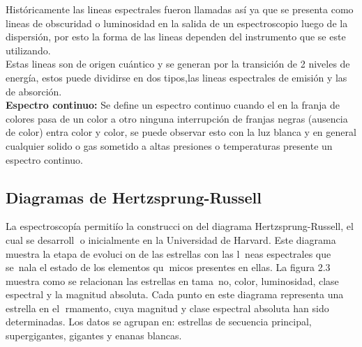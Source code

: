 \documentclass[11pt]{article}
\begin{document}
Históricamente las lineas espectrales fueron llamadas así ya que se  presenta como lineas de obscuridad o luminosidad en la salida de un espectroscopio luego de la dispersión, por esto la forma de las lineas dependen del instrumento que se este utilizando.\\
Estas lineas son de origen cuántico y se generan por la transición de 2 niveles de energía, estos puede dividirse en dos tipos,las lineas espectrales de emisión y las de absorción.\cite{troccoli}\\

\textbf{Espectro continuo:}
Se define un espectro continuo cuando el en la franja de colores  pasa de un color a otro ninguna interrupción de franjas negras (ausencia de color) entra color y color, se puede observar esto con la luz blanca y en general cualquier solido o gas sometido a altas presiones o temperaturas presente un espectro continuo.





\subsection {Diagramas de Hertzsprung-Russell}



La espectroscopía permitiío la construccion del diagrama Hertzsprung-Russell, el cual se desarroll
o inicialmente en la Universidad de Harvard.
Este diagrama muestra la etapa de evolucion
de las estrellas con las lneas espectrales que se~nala el estado de los elementos qumicos presentes
en ellas. La figura 2.3 muestra como se relacionan las estrellas en tama~no, color, luminosidad,
clase espectral y la magnitud absoluta. Cada punto en este diagrama representa una
estrella en el rmamento, cuya magnitud y clase espectral absoluta han sido determinadas.
Los datos se agrupan en: estrellas de secuencia principal, supergigantes, gigantes y enanas
blancas.













\end{document}
